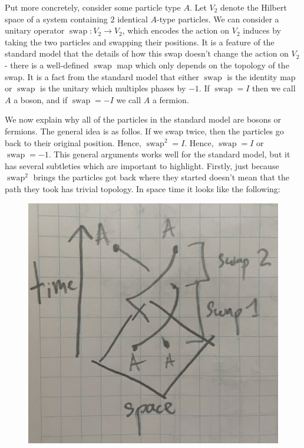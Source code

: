 \documentclass{article}
\theoremstyle{definition}
\DeclareMathOperator{\swap}{swap}
\newcommand{\0}{\left|0\right>}
\newcommand{\1}{\left|1\right>}
\numberwithin{figure}{section}
\begin{document}
Put more concretely, consider some particle type $A$. Let $V_2$ denote the Hilbert space of a system containing $2$ identical $A$-type particles. We can consider a unitary operator $\swap:V_2\to V_2$, which encodes the action on $V_2$ induces by taking the two particles and swapping their positions. It is a feature of the standard model that the details of how this swap doesn't change the action on $V_2$ - there is a well-defined $\swap$ map which only depends on the topology of the swap. It is a fact from the standard model that either $\swap$ is the identity map or $\swap$ is the unitary which multiples phases by $-1$. If $\swap=I$ then we call $A$ a boson, and if $\swap=-I$ we call $A$ a fermion.

We now explain why all of the particles in the standard model are bosons or fermions. The general idea is as follos. If we swap twice, then the particles go back to their original position. Hence, $\swap^2=I$. Hence, $\swap=I$ or $\swap=-1$. This general arguments works well for the standard model, but it has several subtleties which are important to highlight. Firstly, just because $\swap^2$ brings the particles got back where they started doesn't mean that the path they took has trivial topology. In space time it looks like the following:

\begin{figure}[h]
\begin{center}
\includegraphics[scale=.04]{two-swaps}
\end{center}
\end{figure}
\end{document}
